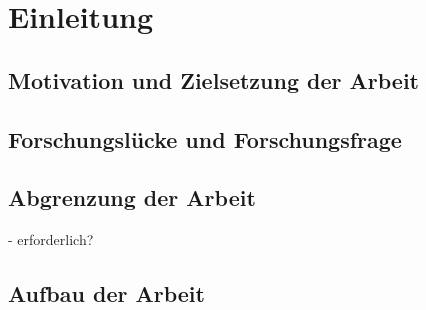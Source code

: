 \chapter{Einleitung}
\label{ch:einleitung}
\section{Motivation und Zielsetzung der Arbeit}
\label{ch:1.1}

\section{Forschungslücke und Forschungsfrage}
\label{ch:1.2}

\section{Abgrenzung der Arbeit}
\label{ch:1.3}

- erforderlich?

\section{Aufbau der Arbeit}
\label{ch: 1.4}
